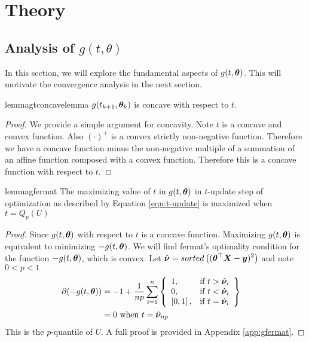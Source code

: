 \documentclass{article} %
\begin{document}
	\section{Theory} 
	
	\subsection{Analysis of $g(t,\theta)$}
	
	In this section, we will explore the fundamental aspects of $g(t,{\bm{\theta}})$. This will motivate the convergence analysis in the next section.
	
	\begin{restatable}{lemma}{gtconcavelemma}
		\label{lem:gtcomcavelemma}
		$g(t_{k+1},{\bm{\theta}}_k)$ is concave with respect to $t$.
	\end{restatable}
	\begin{proof}
		We provide a simple argument for concavity. Note $t$ is a concave and convex function. Also $(\cdot)^+$ is a convex strictly non-negative function. Therefore we have a concave function minus the non-negative multiple of a summation of an affine function composed with a convex function. Therefore this is a concave function with respect to $t$. 
	\end{proof}	
	
	\begin{restatable}{lemma}{gfermat}
		\label{lem:gfermat}
		The maximizing value of $t$ in $g(t,{\bm{\theta}})$ in $t$-update step of optimization as described by Equation \ref{eqn:t-update} is maximized when $t = Q_p(U)$
	\end{restatable}
		\begin{proof}
		Since $\displaystyle g(t,{\bm{\theta}})$ with respect to $t$ is a concave function. Maximizing $g(t,{\bm{\theta}})$ is equivalent to minimizing $-g(t,{\bm{\theta}})$. We will find fermat's optimality condition for the function $\displaystyle -g(t,{\bm{\theta}})$, which is convex. 
		Let $\displaystyle \hat{{\bm{\nu}}} = sorted\left(({\bm{\theta}}^\top{\bm{X}} - {\bm{y}})^2\right)$ and note $\displaystyle 0 < p < 1$
		\begin{align}
			\partial{\displaystyle (-g(t,\boldsymbol{\theta}})) 
			&= -1 + \frac{1}{np}\sum_{i=1}^{n}
			\left\{
			\begin{array}{lr}
				1, & \text{if } t > \hat{{\bm{\nu}}}_i\\
				0, & \text{if } t < \hat{{\bm{\nu}}}_i \\
				\left[0,1\right], & \text{if } t = \hat{{\bm{\nu}}}_i \\
			\end{array}
			\right\}&&\\
			&= 0 \text{ when }\displaystyle t = \hat{{\bm{\nu}}}_{np}&&
		\end{align}
		This is the $p$-quantile of $U$. A full proof is provided in Appendix \ref{app:gfermat}.
	\end{proof}
	
\end{document}
